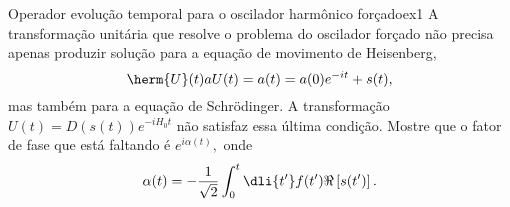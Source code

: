 \begin{exercício}{Operador evolução temporal para o oscilador harmônico forçado}{ex1}
   A transformação unitária que resolve o problema do oscilador forçado não precisa apenas produzir solução para a equação de movimento de Heisenberg,
   \begin{equation*}
      \herm{U}(t) a U(t) = a(t) = a(0) e^{-it} + s(t),
   \end{equation*}
   mas também para a equação de Schrödinger. A transformação \(U(t) = D(s(t)) e^{-i H_0 t}\) não satisfaz essa última condição. Mostre que o fator de fase que está faltando é \(e^{i \alpha(t)},\) onde
   \begin{equation*}
      \alpha(t) = - \frac{1}{\sqrt{2}} \int_0^t \dli{t'} f(t') \Re\left[s(t')\right].
   \end{equation*}
\end{exercício}
